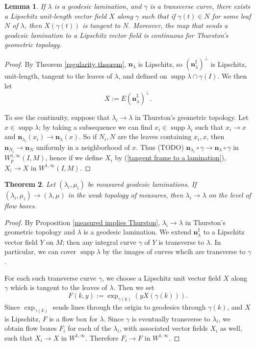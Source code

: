 \documentclass[reqno,10pt]{amsart}
\DeclareMathOperator{\supp}{supp}
\newcommand{\normal}{\mathbf n}
\newtheorem{theorem}{Theorem}[section]
\newtheorem{lemma}[theorem]{Lemma}
\theoremstyle{definition}
\numberwithin{equation}{section}
\begin{document}
\begin{lemma}
If $\lambda$ is a geodesic lamination, and $\gamma$ is a transverse curve, there exists a Lipschitz unit-length vector field $X$ along $\gamma$ such that if $\gamma(t) \in N$ for some leaf $N$ of $\lambda$, then $X(\gamma(t))$ is tangent to $N$.
Moreover, the map that sends a geodesic lamination to a Lipschitz vector field is continuous for Thurston's geometric topology.
\end{lemma}
\begin{proof}
By Theorem \ref{regularity theorem}, $\normal_\lambda$ is Lipschitz, so $(\normal_\lambda^\sharp)^\perp$ is Lipschitz, unit-length, tangent to the leaves of $\lambda$, and defined on $\supp \lambda \cap \gamma(I)$.
We then let
\begin{equation}\label{tangent frame to a lamination}
	X := E(\normal_\lambda^\sharp)^\perp.
\end{equation}

To see the continuity, suppose that $\lambda_i \to \lambda$ in Thurston's geometric topology.
Let $x \in \supp \lambda$; by taking a subsequence we can find $x_i \in \supp \lambda_i$ such that $x_i \to x$ and $\normal_{\lambda_i}(x_i) \to \normal_\lambda(x)$.
So if $N_i, N$ are the leaves containing $x_i, x$, then $\normal_{N_i} \to \normal_N$ uniformly in a neighborhood of $x$.
Thus (TODO) $\normal_{\lambda_i} \circ \gamma \to \normal_\lambda \circ \gamma$ in $W^{1, \infty}_p(I, M)$, hence if we define $X_i$ by (\ref{tangent frame to a lamination}), $X_i \to X$ in $W^{1, \infty}(I, M)$.
\end{proof}

\begin{theorem}
Let $(\lambda_i, \mu_i)$ be measured geodesic laminations.
If $(\lambda_i, \mu_i) \to (\lambda, \mu)$ in the weak topology of measures, then $\lambda_i \to \lambda$ on the level of flow boxes.
\end{theorem}
\begin{proof}
By Proposition \ref{measured implies Thurston}, $\lambda_i \to \lambda$ in Thurston's geometric topology and $\lambda$ is a geodesic lamination.
We extend $\normal_\lambda^\sharp$ to a Lipschitz vector field $Y$ on $M$; then any integral curve $\gamma$ of $Y$ is transverse to $\lambda$.
In particular, we can cover $\supp \lambda$ by the images of curves whcih are transverse to $\gamma$.

For each such transverse curve $\gamma$, we choose a Lipschitz unit vector field $X$ along $\gamma$ which is tangent to the leaves of $\lambda$.
Then we set
$$F(k, y) := \exp_{\gamma(k)}(yX(\gamma(k))).$$
Since $\exp_{\gamma(k)}$ sends lines through the origin to geodesics through $\gamma(k)$, and $X$ is Lipschitz, $F$ is a flow box for $\lambda$.
Since $\gamma$ is eventually transverse to $\lambda_i$, we obtain flow boxes $F_i$ for each of the $\lambda_i$, with associated vector fields $X_i$ as well, such that $X_i \to X$ in $W^{1, \infty}$. Therefore $F_i \to F$ in $W^{1, \infty}$.
\end{proof}
\end{document}
